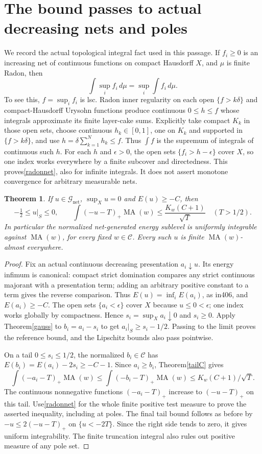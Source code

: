 \documentclass[11pt]{article}
\newcommand{\MA}{\operatorname{MA}}
\newcommand{\C}{\mathcal C}
\newcommand{\GN}{\mathcal G_{\mathrm{net}}}
\newtheorem{theorem}{Theorem}
\theoremstyle{remark}\newtheorem{remark}[theorem]{Remark}
\begin{document}
\section{The bound passes to actual decreasing nets and poles}
We record the actual topological integral fact used in this
passage. If $f_i\ge0$ is an increasing net of continuous
functions on compact Hausdorff $X$, and $\mu$ is finite Radon,
then
\begin{equation}\label{radonnet}
 \int\sup_i f_i\,d\mu=\sup_i\int f_i\,d\mu.
\end{equation}
To see this, $f=\sup_i f_i$ is lsc. Radon inner regularity on
each open $\{f>k\delta\}$ and compact-Hausdorff Urysohn
functions produce continuous $0\le h\le f$ whose integrals
approximate its finite layer-cake sums. Explicitly take compact
$K_k$ in those open sets, choose continuous $h_k\in[0,1]$,
one on $K_k$ and supported in $\{f>k\delta\}$, and use
$h=\delta\sum_{k=1}^N h_k\le f$. Thus $\int f$ is the
supremum of integrals of continuous such $h$.
For each $h$ and $\epsilon>0$, the open sets
$\{f_i>h-\epsilon\}$ cover $X$, so one index works everywhere
by a finite subcover and directedness. This proves\eqref{radonnet},
also for infinite integrals. It does not assert monotone
convergence for arbitrary measurable nets.

\begin{theorem}\label{tailN}
If $u\in\GN$, $\sup_Xu=0$ and $E(u)\ge-C$, then
\[
 -\tfrac12\le u|_S\le0,\qquad
 \int(-u-T)_+\MA(w)\le\frac{K_w(C+1)}{\sqrt T}
 \quad(T>1/2).
\]
In particular the normalized net-generated energy sublevel is
uniformly integrable against $\MA(w)$, for every fixed $w\in\C$.
Every such $u$ is finite $\MA(w)$-almost everywhere.
\end{theorem}
\begin{proof}
Fix an actual continuous decreasing presentation $a_i\downarrow u$.
Its energy infimum is canonical: compact strict domination
compares any strict continuous majorant with a presentation term;
adding an arbitrary positive constant to a term gives the reverse
comparison. Thus $E(u)=\inf_iE(a_i)$, as in406, and
$E(a_i)\ge-C$. The open sets $\{a_i<\epsilon\}$ cover $X$
because $u\le0<\epsilon$; one index works globally by
compactness. Hence $s_i=\sup_Xa_i\downarrow0$ and $s_i\ge0$.
Apply Theorem\ref{gauss} to $b_i=a_i-s_i$ to get
$a_i|_S\ge s_i-1/2$. Passing to the limit proves the reference
bound, and the Lipschitz bounds also pass pointwise.

On a tail $0\le s_i\le1/2$, the normalized $b_i\in\C$ has
$E(b_i)=E(a_i)-2s_i\ge-C-1$.
Since $a_i\ge b_i$, Theorem\ref{tailC} gives
\[
 \int(-a_i-T)_+\MA(w)\le\int(-b_i-T)_+\MA(w)
 \le K_w(C+1)/\sqrt T.
\]
The continuous nonnegative functions $(-a_i-T)_+$ increase to
$(-u-T)_+$ on this tail. Use\eqref{radonnet} for the whole
finite positive test measure to prove the asserted inequality,
including at poles. The final tail bound follows as before by
$-u\le2(-u-T)_+$ on $\{u<-2T\}$.
Since the right side tends to zero, it gives uniform
integrability. The finite truncation integral also rules out
positive measure of any pole set.
\end{proof}
\end{document}

